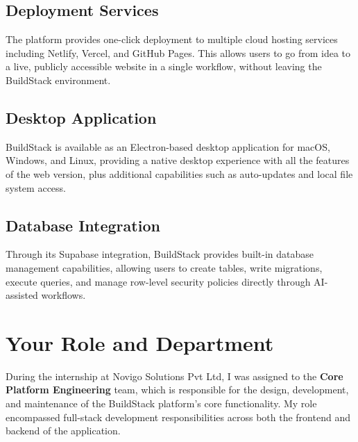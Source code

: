 \documentclass[12pt,a4paper,openany]{report}
\begin{document}
\subsection{Deployment Services}
The platform provides one-click deployment to multiple cloud hosting services including Netlify, Vercel, and GitHub Pages. This allows users to go from idea to a live, publicly accessible website in a single workflow, without leaving the BuildStack environment.

\subsection{Desktop Application}
BuildStack is available as an Electron-based desktop application for macOS, Windows, and Linux, providing a native desktop experience with all the features of the web version, plus additional capabilities such as auto-updates and local file system access.

\subsection{Database Integration}
Through its Supabase integration, BuildStack provides built-in database management capabilities, allowing users to create tables, write migrations, execute queries, and manage row-level security policies directly through AI-assisted workflows.

\section{Your Role and Department}

During the internship at Novigo Solutions Pvt Ltd, I was assigned to the \textbf{Core Platform Engineering} team, which is responsible for the design, development, and maintenance of the BuildStack platform's core functionality. My role encompassed full-stack development responsibilities across both the frontend and backend of the application.
\end{document}
